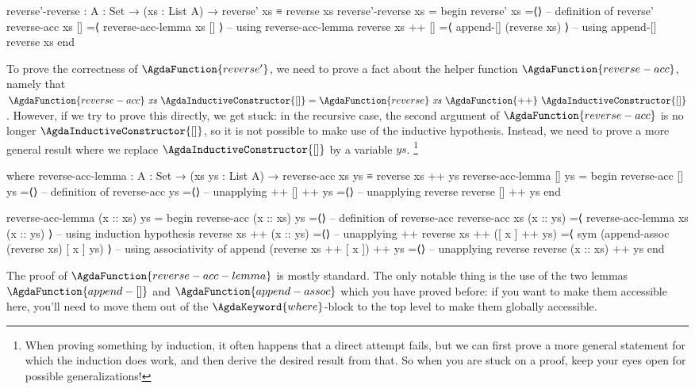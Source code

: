 \documentclass[a4paper,UKenglish]{tufte-handout}
\theoremstyle{definition}
\newcommand\var[1]{\mathit{#1}}
\newcommand\fun[1]{{\AgdaFunction{#1}}}
\newcommand\con[1]{{\AgdaInductiveConstructor{#1}}}
\newcommand\keyw[1]{{\AgdaKeyword{#1}}}
\newcommand\nil{\con{[]}}
\begin{document}
\begin{AgdaAlign}
\begin{code}[number]
reverse'-reverse : {A : Set} → (xs : List A) → reverse' xs ≡ reverse xs
reverse'-reverse xs =
  begin
    reverse' xs
  =⟨⟩                           -- definition of reverse'
    reverse-acc xs []
  =⟨ reverse-acc-lemma xs [] ⟩  -- using reverse-acc-lemma
    reverse xs ++ []
  =⟨ append-[] (reverse xs) ⟩   -- using append-[]
    reverse xs
  end
\end{code}
To prove the correctness of $\fun{reverse'}$, we need to prove a fact
about the helper function $\fun{reverse-acc}$, namely that
$\fun{reverse-acc}\ \var{xs}\ \nil = \fun{reverse}\ \var{xs}\
\fun{++}\ \nil$. However, if we try to prove this directly, we get
stuck: in the recursive case, the second argument of
$\fun{reverse-acc}$ is no longer $\nil$, so it is not possible to make
use of the inductive hypothesis. Instead, we need to prove a more
general result where we replace $\nil$ by a variable $\var{ys}$.%
\footnote{When proving something by induction, it often happens that a
direct attempt fails, but we can first prove a more general statement
for which the induction does work, and then derive the desired result
from that. So when you are stuck on a proof, keep your eyes open for
possible generalizations!  }
\begin{AgdaSuppressSpace}
\begin{code}[number]
  where
    reverse-acc-lemma : {A : Set} → (xs ys : List A)
      → reverse-acc xs ys ≡ reverse xs ++ ys
    reverse-acc-lemma [] ys =
      begin
        reverse-acc [] ys
      =⟨⟩                     -- definition of reverse-acc
        ys
      =⟨⟩                     -- unapplying ++
        [] ++ ys
      =⟨⟩                     -- unapplying reverse
        reverse [] ++ ys
      end
\end{code}
\begin{fullwidth}
\begin{code}[number]
    reverse-acc-lemma (x :: xs) ys =
      begin
        reverse-acc (x :: xs) ys
      =⟨⟩                                            -- definition of reverse-acc
        reverse-acc xs (x :: ys)
      =⟨ reverse-acc-lemma xs (x :: ys) ⟩            -- using induction hypothesis
        reverse xs ++ (x :: ys)
      =⟨⟩                                            -- unapplying ++
        reverse xs ++ ([ x ] ++ ys)
      =⟨ sym (append-assoc (reverse xs) [ x ] ys) ⟩  -- using associativity of append
        (reverse xs ++ [ x ]) ++ ys
      =⟨⟩                                            -- unapplying reverse
        reverse (x :: xs) ++ ys
      end
\end{code}
\end{fullwidth}
\end{AgdaSuppressSpace}
\end{AgdaAlign}
The proof of $\fun{reverse-acc-lemma}$ is mostly standard. The only
notable thing is the use of the two lemmas $\fun{append-[]}$ and
$\fun{append-assoc}$ which you have proved before: if you want to make
them accessible here, you'll need to move them out of the
$\keyw{where}$-block to the top level to make them globally
accessible.
\end{document}
